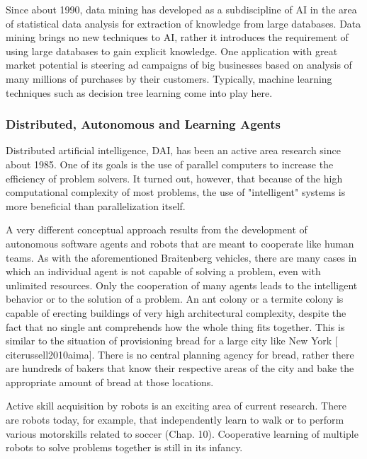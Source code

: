 \documentclass[10pt]{book}
\begin{document}
Since about 1990, data mining has developed as a subdiscipline of AI in the area of statistical data analysis for extraction of knowledge from large databases. Data mining brings no new techniques to AI, rather it introduces the requirement of using large databases to gain explicit knowledge. One application with great market potential is steering ad campaigns of big businesses based on analysis of many millions of purchases by their customers. Typically, machine learning techniques such as decision tree learning come into play here.

\subsubsection*{Distributed, Autonomous and Learning Agents}
Distributed artificial intelligence, DAI, has been an active area research since about 1985. One of its goals is the use of parallel computers to increase the efficiency of problem solvers. It turned out, however, that because of the high computational complexity of most problems, the use of "intelligent" systems is more beneficial than parallelization itself.

A very different conceptual approach results from the development of autonomous software agents and robots that are meant to cooperate like human teams. As with the aforementioned Braitenberg vehicles, there are many cases in which an individual agent is not capable of solving a problem, even with unlimited resources. Only the cooperation of many agents leads to the intelligent behavior or to the solution of a problem. An ant colony or a termite colony is capable of erecting buildings of very high architectural complexity, despite the fact that no single ant comprehends how the whole thing fits together. This is similar to the situation of provisioning bread for a large city like New York [\\cite{russell2010aima}]. There is no central planning agency for bread, rather there are hundreds of bakers that know their respective areas of the city and bake the appropriate amount of bread at those locations.

Active skill acquisition by robots is an exciting area of current research. There are robots today, for example, that independently learn to walk or to perform\\
various motorskills related to soccer (Chap. 10). Cooperative learning of multiple robots to solve problems together is still in its infancy.


\end{document}
